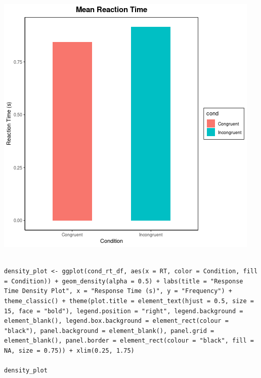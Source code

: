 \documentclass{article}
\begin{document}
\begin{center}
\includegraphics[width=.9\linewidth]{converted_stroop2.png}
\end{center}



\begin{verbatim}

density_plot <- ggplot(cond_rt_df, aes(x = RT, color = Condition, fill = Condition)) + geom_density(alpha = 0.5) + labs(title = "Response Time Density Plot", x = "Response Time (s)", y = "Frequency") + theme_classic() + theme(plot.title = element_text(hjust = 0.5, size = 15, face = "bold"), legend.position = "right", legend.background = element_blank(), legend.box.background = element_rect(colour = "black"), panel.background = element_blank(), panel.grid = element_blank(), panel.border = element_rect(colour = "black", fill = NA, size = 0.75)) + xlim(0.25, 1.75)

density_plot

\end{verbatim}
\end{document}
